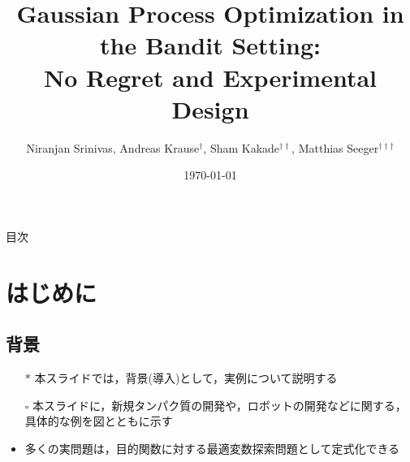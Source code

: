\documentclass[dvipdfmx, 10.5pt]{beamer}
\title[]{Gaussian Process Optimization in the Bandit Setting:\\No Regret and Experimental Design}
\subtitle{}
\author[]{Niranjan Srinivas, Andreas Krause$^{\dag}$, Sham Kakade$^{\dag\dag}$, Matthias Seeger$^{\dag\dag\dag}$}
\date[\today]{\today}
\institute[]{$\dag$: California Institute of Technology\\
$\dag\dag$: University of Pennsylvania\\
$\dag\dag\dag$: Saarland University}
\begin{document}

\begin{frame}
\maketitle%
\thispagestyle{empty}%
\end{frame}



\begin{frame}[noframenumbering]{目次}
	\tableofcontents[hideallsubsections]
	\thispagestyle{empty} %
\end{frame}

\section{はじめに}

\subsection{背景}
\begin{frame}{\insertsubsection}
	\begin{itemize}
		\item[$\ast$] 本スライドでは，背景(導入)として，実例について説明する
		\item[$\square$] 本スライドに，新規タンパク質の開発や，ロボットの開発などに関する，具体的な例を図とともに示す
		\item 多くの実問題は，目的関数に対する最適変数探索問題として定式化できる
		

	\end{itemize}
\end{frame}

\end{document}
